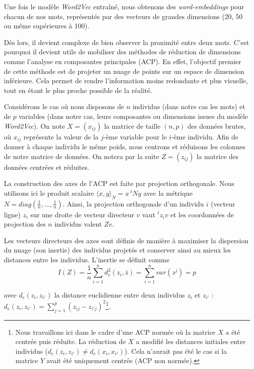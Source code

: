 \documentclass[11pt,french,french]{article}
\let\rmarkdownfootnote\footnote%
\def\footnote{\protect\rmarkdownfootnote}
\begin{document}
Une fois le modèle \emph{Word2Vec} entraîné, nous obtenons des \emph{word-embeddings} pour chacun de nos mots, représentés par des vecteurs de grandes dimensions (20, 50 ou même supérieures à 100).

Dès lors, il devient complexe de bien observer la proximité entre deux mots. C'est pourquoi il devient utile de mobiliser des méthodes de réduction de dimensions comme l'analyse en composantes principales (ACP). En effet, l'objectif premier de cette méthode est de projeter un nuage de points sur un espace de dimension inférieure. Cela permet de rendre l'information moins redondante et plus visuelle, tout en étant le plus proche possible de la réalité.

Considérons le cas où nous disposons de \(n\) individus (dans notre cas les mots) et de \(p\) variables (dans notre cas, leurs composantes ou dimensions issues du modèle \emph{Word2Vec}). On note \(X = (x_{ij})\) la matrice de taille \((n,p)\) des données brutes, où \(x_{ij}\) représente la valeur de la \(j\)-ème variable pour le \(i\)-ème individu. Afin de donner à chaque individu le même poids, nous centrons et réduisons les colonnes de notre matrice de données. On notera par la suite \(Z = (z_{ij})\) la matrice des données centrées et réduites.

La construction des axes de l'ACP est faite par projection orthogonale. Nous utilisons ici le produit scalaire \(\langle x,y\rangle_{N} = x\,^t N y\) avec la métrique \(N = diag(\frac{1}{n},...,\frac{1}{n})\). Ainsi, la projection orthogonale d'un individu \(i\) (vecteur ligne) \(z_i\) sur une droite de vecteur directeur \(v\) vaut \(^tz_iv\) et les coordonnées de projection des \(n\) individus valent \(Zv\).

Les vecteurs directeurs des axes sont définis de manière à maximiser la dispersion du nuage (son inertie) des individus projetés et conserver ainsi au mieux les distances entre les individus. L'inertie se définit comme
\[I(Z) = \frac{1}{n} \sum \limits_{i = 1}^n d_{e}^2(z_i,\bar{z}) =
\sum \limits_{i = 1}^n var(z^j) = p\]

avec \(d_{e}(z_i,z_{i'})\) la distance euclidienne entre deux individus \(z_i\) et \(z_{i'}\) : \(d_{e}(z_i,z_{i'}) = \sum \limits_{j=1}^p (z_{ij} - z_{i'j})^2\)\footnote{Nous travaillons ici dans le cadre d'une ACP normée où la matrice \(X\) a été centrée puis réduite. La réduction de \(X\) a modifié les distances initiales entre individus (\(d_{e}(z_i,z_{i'}) \neq d_{e}(x_i,x_{i'})\)). Cela n'aurait pas été le cas si la matrice \(Y\) avait été uniquement centrée (ACP non normée).}.
\end{document}

